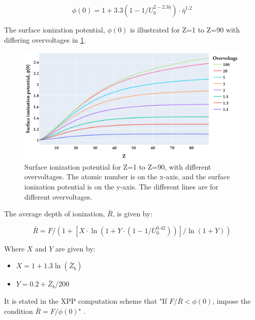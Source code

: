 \begin{equation}
    \label{eq:theory:quantitative:pap:phi_0}
    \phi(0) = 1 + 3.3 (1-1/U_0^{2 - 2.3 \bar{\eta}}) \cdot \bar{\eta}^{1.2}
\end{equation}


The surface ionization potential, $\phi(0)$ is illustrated for Z=1 to Z=90 with differing overvoltages in \cref{fig:pap:phi_0}.


\begin{figure}[htbp]
    \centering
    \includegraphics[width=0.8\linewidth]{figures/PAP_surface_ionization_potential.pdf}
    \caption{
        Surface ionization potential for Z=1 to Z=90, with different overvoltages.
        The atomic number is on the x-axis, and the surface ionization potential is on the y-axis.
        The different lines are for different overvoltages.
    }
    \label{fig:pap:phi_0}
\end{figure}

The average depth of ionization, $\bar{R}$, is given by:

\begin{equation}
    \label{eq:theory:quantitative:pap:R_bar}
    \bar{R} = F / (1 + [X \cdot \ln(1 + Y \cdot (1 - 1/U_0^{0.42}))]/\ln(1 + Y))
\end{equation}

Where $X$ and $Y$ are given by:

\begin{itemize}
    \item $ X = 1 + 1.3 \ln(\bar{Z}_b) $
    \item $ Y = 0.2 + \bar{Z}_b/200 $
\end{itemize}



It is stated in the XPP computation scheme that "If $ F/\bar{R} < \phi(0) $, impose the condition $ \bar{R} = F/\phi(0) $" \cite[Appendix 4]{pap_1991}.


